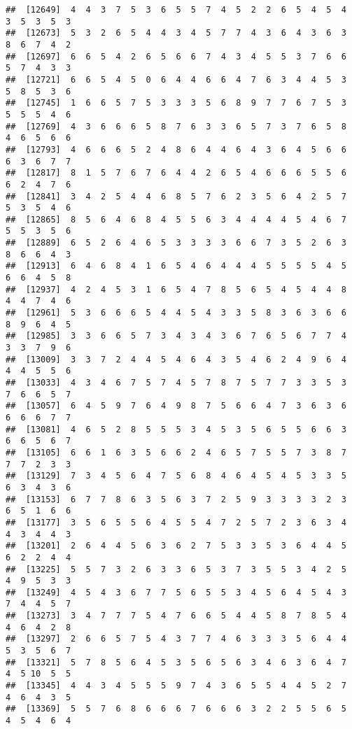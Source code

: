 \documentclass[
]{book}
\begin{document}
\begin{verbatim}
##  [12649]  4  4  3  7  5  3  6  5  5  7  4  5  2  2  6  5  4  5  4  3  5  3  5  3
##  [12673]  5  3  2  6  5  4  4  3  4  5  7  7  4  3  6  4  3  6  3  8  6  7  4  2
##  [12697]  6  6  5  4  2  6  5  6  6  7  4  3  4  5  5  3  7  6  6  5  7  4  3  3
##  [12721]  6  6  5  4  5  0  6  4  4  6  6  4  7  6  3  4  4  5  3  5  8  5  3  6
##  [12745]  1  6  6  5  7  5  3  3  3  5  6  8  9  7  7  6  7  5  3  5  5  5  4  6
##  [12769]  4  3  6  6  6  5  8  7  6  3  3  6  5  7  3  7  6  5  8  4  6  5  6  6
##  [12793]  4  6  6  6  5  2  4  8  6  4  4  6  4  3  6  4  5  6  6  6  3  6  7  7
##  [12817]  8  1  5  7  6  7  6  4  4  2  6  5  4  6  6  6  5  5  6  6  2  4  7  6
##  [12841]  3  4  2  5  4  4  6  8  5  7  6  2  3  5  6  4  2  5  7  5  3  5  4  6
##  [12865]  8  5  6  4  6  8  4  5  5  6  3  4  4  4  4  5  4  6  7  5  5  3  5  6
##  [12889]  6  5  2  6  4  6  5  3  3  3  3  6  6  7  3  5  2  6  3  8  6  6  4  3
##  [12913]  6  4  6  8  4  1  6  5  4  6  4  4  4  5  5  5  5  4  5  6  6  4  5  8
##  [12937]  4  2  4  5  3  1  6  5  4  7  8  5  6  5  4  5  4  4  8  4  4  7  4  6
##  [12961]  5  3  6  6  6  5  4  4  5  4  3  3  5  8  3  6  3  6  6  8  9  6  4  5
##  [12985]  3  3  6  6  5  7  3  4  3  4  3  6  7  6  5  6  7  7  4  3  3  7  9  6
##  [13009]  3  3  7  2  4  4  5  4  6  4  3  5  4  6  2  4  9  6  4  4  4  5  5  6
##  [13033]  4  3  4  6  7  5  7  4  5  7  8  7  5  7  7  3  3  5  3  7  6  6  5  7
##  [13057]  6  4  5  9  7  6  4  9  8  7  5  6  6  4  7  3  6  3  6  6  6  6  7  7
##  [13081]  4  6  5  2  8  5  5  5  3  4  5  3  5  6  5  5  6  6  3  6  6  5  6  7
##  [13105]  6  6  1  6  3  5  6  6  2  4  6  5  7  5  5  7  3  8  7  7  7  2  3  3
##  [13129]  7  3  4  5  6  4  7  5  6  8  4  6  4  5  4  5  3  3  5  6  3  4  3  6
##  [13153]  6  7  7  8  6  3  5  6  3  7  2  5  9  3  3  3  3  2  3  6  5  1  6  6
##  [13177]  3  5  6  5  5  6  4  5  5  4  7  2  5  7  2  3  6  3  4  4  3  4  4  3
##  [13201]  2  6  4  4  5  6  3  6  2  7  5  3  3  5  3  6  4  4  5  6  2  2  4  4
##  [13225]  5  5  7  3  2  6  3  3  6  5  3  7  3  5  5  3  4  2  5  4  9  5  3  3
##  [13249]  4  5  4  3  6  7  7  5  6  5  5  3  4  5  6  4  5  4  3  7  4  4  5  7
##  [13273]  3  4  7  7  7  5  4  7  6  6  5  4  4  5  8  7  8  5  4  4  6  4  2  8
##  [13297]  2  6  6  5  7  5  4  3  7  7  4  6  3  3  3  5  6  4  4  5  3  5  6  7
##  [13321]  5  7  8  5  6  4  5  3  5  6  5  6  3  4  6  3  6  4  7  4  5 10  5  5
##  [13345]  4  4  3  4  5  5  5  9  7  4  3  6  5  5  4  4  5  2  7  4  6  4  3  5
##  [13369]  5  5  7  6  8  6  6  6  7  6  6  6  3  2  2  5  5  6  5  4  5  4  6  4

\end{verbatim}
\end{document}
